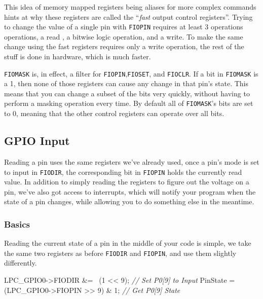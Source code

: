\documentclass[]{article}
\newenvironment{Shaded}{\begin{snugshade}}{\end{snugshade}}
\newcommand{\DecValTok}[1]{\textcolor[rgb]{0.00,0.00,0.81}{{#1}}}
\newcommand{\CommentTok}[1]{\textcolor[rgb]{0.56,0.35,0.01}{\textit{{#1}}}}
\newcommand{\NormalTok}[1]{{#1}}
\begin{document}
This idea of memory mapped registers being aliases for more complex
commands hints at why these registers are called the ``\emph{fast}
output control registers''. Trying to change the value of a single pin
with \texttt{FIOPIN} requires at least 3 operations operations, a read ,
a bitwise logic operation, and a write. To make the same change using
the fast registers requires only a write operation, the rest of the
stuff is done in hardware, which is much faster.

\texttt{FIOMASK} is, in effect, a filter for
\texttt{FIOPIN},\texttt{FIOSET}, and \texttt{FIOCLR}. If a bit in
\texttt{FIOMASK} is a 1, then none of those registers can cause any
change in that pin's state. This means that you can change a subset of
the bits very quickly, without having to perform a masking operation
every time. By default all of \texttt{FIOMASK}'s bits are set to 0,
meaning that the other control registers can operate over all bits.

\subsection{GPIO Input}

Reading a pin uses the same registers we've already used, once a pin's
mode is set to input in \texttt{FIODIR}, the corresponding bit in
\texttt{FIOPIN} holds the currently read value. In addition to simply
reading the registers to figure out the voltage on a pin, we've also got
access to interrupts, which will notify your program when the state of a
pin changes, while allowing you to do something else in the meantime.

\subsubsection{Basics}

Reading the current state of a pin in the middle of your code is simple,
we take the same two registers as before \texttt{FIODIR} and
\texttt{FIOPIN}, and use them slightly differently.

\begin{Shaded}
\begin{Highlighting}[]
    \NormalTok{LPC_GPIO0->FIODIR &= ~(}\DecValTok{1} \NormalTok{<< }\DecValTok{9}\NormalTok{);          }\CommentTok{// Set P0[9] to Input}
    \NormalTok{PinState = (LPC_GPIO0->FIOPIN >> }\DecValTok{9}\NormalTok{) & }\DecValTok{1}\NormalTok{; }\CommentTok{// Get P0[9] State}
\end{Highlighting}
\end{Shaded}
\end{document}
